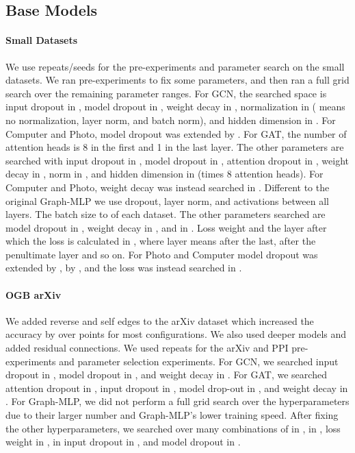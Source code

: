 \documentclass[runningheads]{llncs}
\newcommand{\GraphMLP}{Graph-MLP\xspace}
\begin{document}
\subsection{Base Models}
\paragraph{Small Datasets}
We use  repeats/seeds for the pre-experiments and parameter search on the small datasets.
We ran pre-experiments to fix some parameters, and then ran a full grid search over the remaining parameter ranges.
For GCN, the searched space is input dropout in , model dropout in , weight decay in , normalization in  ( means no normalization,  layer norm, and  batch norm), and hidden dimension in . 
For Computer and Photo, model dropout was extended by  .
For GAT, the number of attention heads is 8 in the first and 1 in the last layer.
The other parameters are searched with input dropout in , model dropout in , attention dropout in , weight decay in , norm in , and hidden dimension in  (times 8 attention heads).
For Computer and Photo, weight decay was instead searched in .
Different to the original \GraphMLP we use dropout, layer norm, and activations between all layers.
The batch size  to  of each dataset.
The other parameters searched are model dropout in , weight decay in , and  in .
Loss weight and the layer after which the loss is calculated in , where layer  means after the last,  after the penultimate layer and so on.
For Photo and Computer model dropout was extended by ,  by , and the loss was instead searched in .



\paragraph{OGB arXiv}
We added reverse and self edges to the arXiv dataset which increased the accuracy by over  points for most configurations.
We also used deeper models and added residual connections. 
We used  repeats for the arXiv and PPI pre-experiments and parameter selection experiments.
For GCN, we searched input dropout in , model dropout in , and weight decay in .
For GAT, we searched attention dropout in , input dropout in , model drop-out in , and weight decay in .
For \GraphMLP, we did not perform a full grid search over the hyperparameters due to their larger number and \GraphMLP's lower training speed.
After fixing the other hyperparameters, we searched over many combinations of  in ,  in , loss weight in ,  in  input dropout in , and model dropout in .
\end{document}
